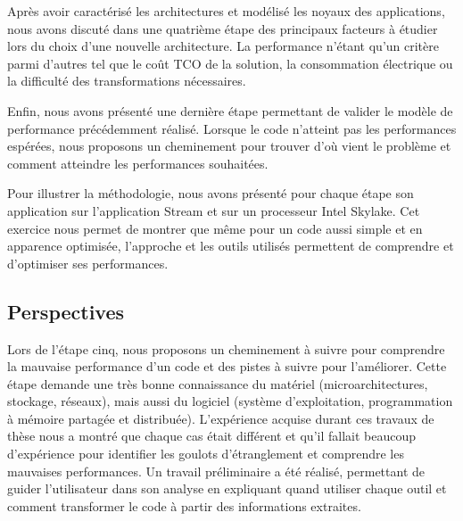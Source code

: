     Après avoir caractérisé les architectures et modélisé les noyaux des applications, nous avons discuté dans une quatrième étape des principaux facteurs à étudier lors du choix d'une nouvelle architecture. La performance n'étant qu'un critère parmi d'autres tel que le coût TCO de la solution, la consommation électrique ou la difficulté des transformations nécessaires.
    
    Enfin, nous avons présenté une dernière étape permettant de valider le modèle de performance précédemment réalisé. Lorsque le code n'atteint pas les performances espérées, nous proposons un cheminement pour trouver d'où vient le problème et comment atteindre les performances souhaitées. 
    
    Pour illustrer la méthodologie, nous avons présenté pour chaque étape son application sur l'application Stream et sur un processeur Intel Skylake. Cet exercice nous permet de montrer que même pour un code aussi simple et en apparence optimisée, l'approche et les outils utilisés permettent de comprendre et d'optimiser ses performances.
    
    
    

\subsection{Perspectives}

    Lors de l'étape cinq, nous proposons un cheminement à suivre pour comprendre la mauvaise performance d'un code et des pistes à suivre pour l'améliorer. Cette étape demande une très bonne connaissance du matériel (microarchitectures, stockage, réseaux), mais aussi du logiciel (système d'exploitation, programmation à mémoire partagée et distribuée). L'expérience acquise durant ces travaux de thèse nous a montré que chaque cas était différent et qu'il fallait beaucoup d'expérience pour identifier les goulots d'étranglement et comprendre les mauvaises performances. Un travail préliminaire a été réalisé, permettant de guider l'utilisateur dans son analyse en expliquant quand utiliser chaque outil et comment transformer le code à partir des informations extraites.
    